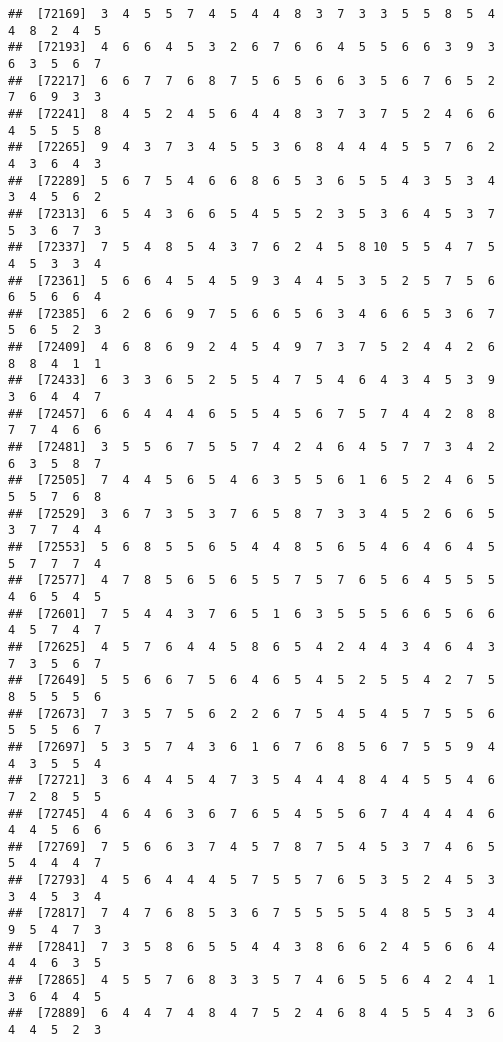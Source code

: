 \documentclass[
]{book}
\begin{document}
\begin{verbatim}
##  [72169]  3  4  5  5  7  4  5  4  4  8  3  7  3  3  5  5  8  5  4  4  8  2  4  5
##  [72193]  4  6  6  4  5  3  2  6  7  6  6  4  5  5  6  6  3  9  3  6  3  5  6  7
##  [72217]  6  6  7  7  6  8  7  5  6  5  6  6  3  5  6  7  6  5  2  7  6  9  3  3
##  [72241]  8  4  5  2  4  5  6  4  4  8  3  7  3  7  5  2  4  6  6  4  5  5  5  8
##  [72265]  9  4  3  7  3  4  5  5  3  6  8  4  4  4  5  5  7  6  2  4  3  6  4  3
##  [72289]  5  6  7  5  4  6  6  8  6  5  3  6  5  5  4  3  5  3  4  3  4  5  6  2
##  [72313]  6  5  4  3  6  6  5  4  5  5  2  3  5  3  6  4  5  3  7  5  3  6  7  3
##  [72337]  7  5  4  8  5  4  3  7  6  2  4  5  8 10  5  5  4  7  5  4  5  3  3  4
##  [72361]  5  6  6  4  5  4  5  9  3  4  4  5  3  5  2  5  7  5  6  6  5  6  6  4
##  [72385]  6  2  6  6  9  7  5  6  6  5  6  3  4  6  6  5  3  6  7  5  6  5  2  3
##  [72409]  4  6  8  6  9  2  4  5  4  9  7  3  7  5  2  4  4  2  6  8  8  4  1  1
##  [72433]  6  3  3  6  5  2  5  5  4  7  5  4  6  4  3  4  5  3  9  3  6  4  4  7
##  [72457]  6  6  4  4  4  6  5  5  4  5  6  7  5  7  4  4  2  8  8  7  7  4  6  6
##  [72481]  3  5  5  6  7  5  5  7  4  2  4  6  4  5  7  7  3  4  2  6  3  5  8  7
##  [72505]  7  4  4  5  6  5  4  6  3  5  5  6  1  6  5  2  4  6  5  5  5  7  6  8
##  [72529]  3  6  7  3  5  3  7  6  5  8  7  3  3  4  5  2  6  6  5  3  7  7  4  4
##  [72553]  5  6  8  5  5  6  5  4  4  8  5  6  5  4  6  4  6  4  5  5  7  7  7  4
##  [72577]  4  7  8  5  6  5  6  5  5  7  5  7  6  5  6  4  5  5  5  4  6  5  4  5
##  [72601]  7  5  4  4  3  7  6  5  1  6  3  5  5  5  6  6  5  6  6  4  5  7  4  7
##  [72625]  4  5  7  6  4  4  5  8  6  5  4  2  4  4  3  4  6  4  3  7  3  5  6  7
##  [72649]  5  5  6  6  7  5  6  4  6  5  4  5  2  5  5  4  2  7  5  8  5  5  5  6
##  [72673]  7  3  5  7  5  6  2  2  6  7  5  4  5  4  5  7  5  5  6  5  5  5  6  7
##  [72697]  5  3  5  7  4  3  6  1  6  7  6  8  5  6  7  5  5  9  4  4  3  5  5  4
##  [72721]  3  6  4  4  5  4  7  3  5  4  4  4  8  4  4  5  5  4  6  7  2  8  5  5
##  [72745]  4  6  4  6  3  6  7  6  5  4  5  5  6  7  4  4  4  4  6  4  4  5  6  6
##  [72769]  7  5  6  6  3  7  4  5  7  8  7  5  4  5  3  7  4  6  5  5  4  4  4  7
##  [72793]  4  5  6  4  4  4  5  7  5  5  7  6  5  3  5  2  4  5  3  3  4  5  3  4
##  [72817]  7  4  7  6  8  5  3  6  7  5  5  5  5  4  8  5  5  3  4  9  5  4  7  3
##  [72841]  7  3  5  8  6  5  5  4  4  3  8  6  6  2  4  5  6  6  4  4  4  6  3  5
##  [72865]  4  5  5  7  6  8  3  3  5  7  4  6  5  5  6  4  2  4  1  3  6  4  4  5
##  [72889]  6  4  4  7  4  8  4  7  5  2  4  6  8  4  5  5  4  3  6  4  4  5  2  3

\end{verbatim}
\end{document}
